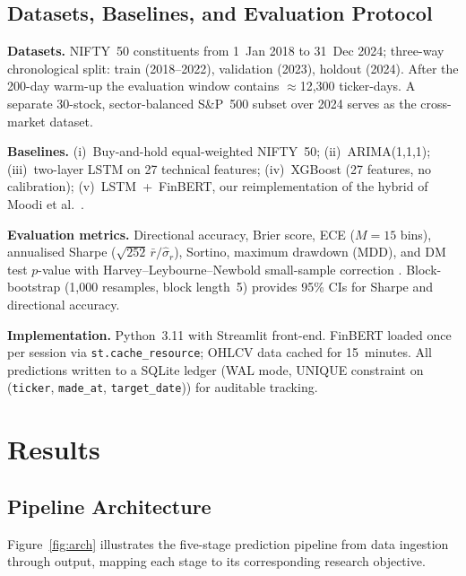 \documentclass[12pt,a4paper]{article}
\begin{document}
\subsection{Datasets, Baselines, and Evaluation Protocol}

\textbf{Datasets.} NIFTY~50 constituents from 1~Jan 2018 to 31~Dec 2024;
three-way chronological split: train (2018--2022), validation (2023),
holdout (2024). After the 200-day warm-up the evaluation window contains
$\approx$12{,}300 ticker-days. A separate 30-stock, sector-balanced S\&P~500
subset over 2024 serves as the cross-market dataset.

\textbf{Baselines.} (i)~Buy-and-hold equal-weighted NIFTY~50; (ii)~ARIMA(1,1,1);
(iii)~two-layer LSTM on 27 technical features; (iv)~XGBoost (27 features, no
calibration); (v)~LSTM~+~FinBERT, our reimplementation of the hybrid of
Moodi et al.\ \cite{r5}.

\textbf{Evaluation metrics.} Directional accuracy, Brier score, ECE
($M=15$ bins), annualised Sharpe ($\sqrt{252}\,\bar{r}/\hat\sigma_r$), Sortino,
maximum drawdown (MDD), and DM test $p$-value \cite{r21} with
Harvey--Leybourne--Newbold small-sample correction \cite{r29}.
Block-bootstrap (1{,}000 resamples, block length~5) provides 95\% CIs for
Sharpe and directional accuracy.

\textbf{Implementation.} Python~3.11 with Streamlit front-end. FinBERT loaded
once per session via \texttt{st.cache\_resource}; OHLCV data cached for
15~minutes. All predictions written to a SQLite ledger (WAL mode, UNIQUE
constraint on (\texttt{ticker}, \texttt{made\_at}, \texttt{target\_date}))
for auditable tracking.

\section{Results}

\subsection{Pipeline Architecture}

Figure~\ref{fig:arch} illustrates the five-stage prediction pipeline from data
ingestion through output, mapping each stage to its corresponding research
objective.
\end{document}
